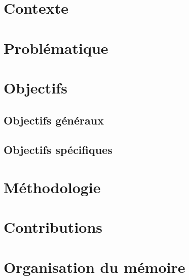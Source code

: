 

\section{Contexte}


\section{Problématique}


\section{Objectifs}


\subsection{Objectifs généraux}


\subsection{Objectifs spécifiques}


\section{Méthodologie}


\section{Contributions}


\section{Organisation du mémoire}

